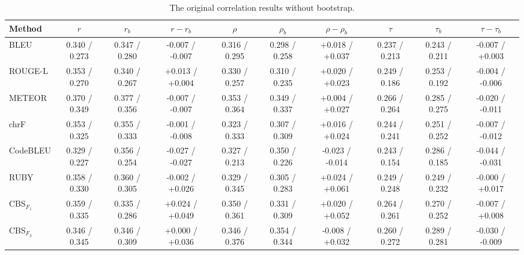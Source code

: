 \begin{table}[t]
    \centering
    \scriptsize
    \setlength{\tabcolsep}{3.5pt}
    \caption{The original correlation results without bootstrap.}
    \label{tab:unified-settings}
    \begin{tabular}{@{}
        l|ccc|ccc|ccc@{}}
        \toprule
        Method & $r$ & $r_b$ & $r-r_b$ & $\rho$ & $\rho_b$ & $\rho-\rho_b$ & $\tau$ & $\tau_b$ & $\tau-\tau_b$ \\
        \midrule
        \midrule
        BLEU                    & 0.340 / 0.273   & 0.347 / 0.280   & -0.007 / -0.007                     & 0.316 / 0.295   & 0.298 / 0.258   & +0.018 / +0.037                     & 0.237 / 0.213   & 0.243 / 0.211   & -0.007 / +0.003                     \\
        ROUGE-L                 & 0.353 / 0.270   & 0.340 / 0.267   & +0.013 / +0.004                     & 0.330 / 0.257   & 0.310 / 0.235   & +0.020 / +0.023                     & 0.249 / 0.186   & 0.253 / 0.192   & -0.004 / -0.006                     \\
        METEOR                  & 0.370 / 0.349   & 0.377 / 0.356   & -0.007 / -0.007                     & 0.353 / 0.364   & 0.349 / 0.337   & +0.004 / +0.027                     & 0.266 / 0.264   & 0.285 / 0.275   & -0.020 / -0.011                     \\
        chrF                    & 0.353 / 0.325   & 0.355 / 0.333   & -0.001 / -0.008                     & 0.323 / 0.333   & 0.307 / 0.309   & +0.016 / +0.024                     & 0.244 / 0.241   & 0.251 / 0.252   & -0.007 / -0.012                     \\
        CodeBLEU                & 0.329 / 0.227   & 0.356 / 0.254   & -0.027 / -0.027                     & 0.327 / 0.213   & 0.350 / 0.226   & -0.023 / -0.014                     & 0.243 / 0.154   & 0.286 / 0.185   & -0.044 / -0.031                     \\
        RUBY                    & 0.358 / 0.330   & 0.360 / 0.305   & -0.002 / +0.026                     & 0.329 / 0.345   & 0.305 / 0.283   & +0.024 / +0.061                     & 0.249 / 0.248   & 0.249 / 0.232   & -0.000 / +0.017                     \\
        CBS$_{F_1}$             & 0.359 / 0.335   & 0.335 / 0.286   & +0.024 / +0.049                     & 0.350 / 0.361   & 0.331 / 0.309   & +0.020 / +0.052                     & 0.264 / 0.261   & 0.270 / 0.252   & -0.007 / +0.008                     \\
        CBS$_{F_3}$             & 0.346 / 0.345   & 0.346 / 0.309   & +0.000 / +0.036                     & 0.346 / 0.376   & 0.354 / 0.344   & -0.008 / +0.032                     & 0.260 / 0.272   & 0.289 / 0.281   & -0.030 / -0.009                     \\

\end{tabular}
\end{table}
